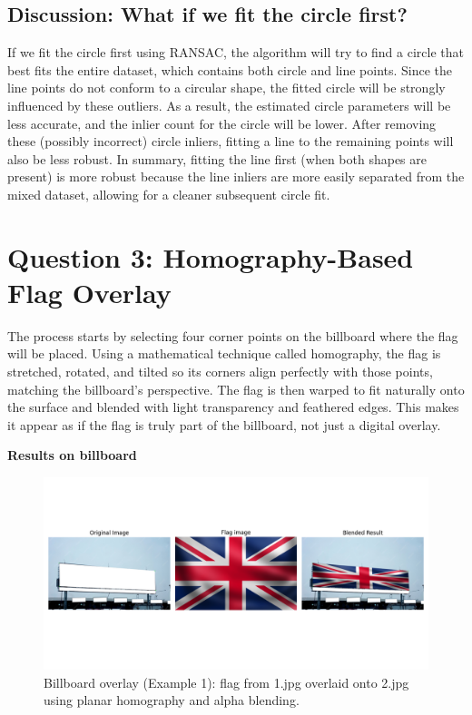 \documentclass[10pt,a4paper,twocolumn]{article}
\begin{document}
\subsection*{Discussion: What if we fit the circle first?}
If we fit the circle first using RANSAC, the algorithm will try to find a circle that best fits the entire dataset, which contains both circle and line points. Since the line points do not conform to a circular shape, the fitted circle will be strongly influenced by these outliers. As a result, the estimated circle parameters will be less accurate, and the inlier count for the circle will be lower. After removing these (possibly incorrect) circle inliers, fitting a line to the remaining points will also be less robust. In summary, fitting the line first (when both shapes are present) is more robust because the line inliers are more easily separated from the mixed dataset, allowing for a cleaner subsequent circle fit.

\section{Question 3: Homography-Based Flag Overlay}


The process starts by selecting four corner points on the billboard where the flag will be placed. Using a mathematical technique called homography, the flag is stretched, rotated, and tilted so its corners align perfectly with those points, matching the billboard’s perspective. The flag is then warped to fit naturally onto the surface and blended with light transparency and feathered edges. This makes it appear as if the flag is truly part of the billboard, not just a digital overlay.

\vspace{4pt}
\noindent\textbf{Results on billboard}
\begin{figure}[H]
    \centering
    \includegraphics[width=0.95\columnwidth]{fig/Figure_1.png}
    \caption{Billboard overlay (Example 1): flag from 1.jpg overlaid onto 2.jpg using planar homography and alpha blending.}
    \label{fig:q3_billboard_ex1}
\end{figure}
\end{document}
